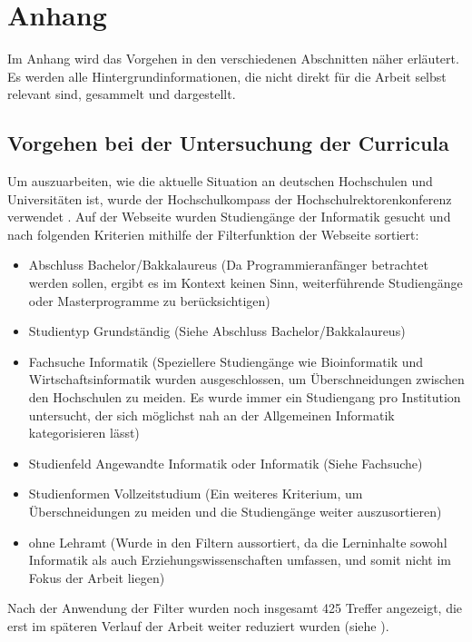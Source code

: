 \clearpage
\section{Anhang}
\label{sec:appendix}

Im Anhang wird das Vorgehen in den verschiedenen Abschnitten näher erläutert. Es werden alle Hintergrundinformationen, die nicht direkt für die Arbeit selbst relevant sind, gesammelt und dargestellt.

\subsection{Vorgehen bei der Untersuchung der Curricula}\label{sec:analysis_curric}
Um auszuarbeiten, wie die aktuelle Situation an deutschen Hochschulen und Universitäten ist, wurde der Hochschulkompass der Hochschulrektorenkonferenz verwendet \cite{hochschulkompass}.
Auf der Webseite wurden Studiengänge der Informatik gesucht und nach folgenden Kriterien mithilfe der Filterfunktion der Webseite sortiert:

\begin{itemize}
    \item Abschluss Bachelor/Bakkalaureus (Da Programmieranfänger betrachtet werden sollen, ergibt es im Kontext keinen Sinn, weiterführende Studiengänge oder Masterprogramme zu berücksichtigen)
    \item Studientyp Grundständig (Siehe Abschluss Bachelor/Bakkalaureus)
    \item Fachsuche Informatik (Speziellere Studiengänge wie Bioinformatik und Wirtschaftsinformatik wurden ausgeschlossen, um Überschneidungen zwischen den Hochschulen zu meiden. Es wurde immer ein Studiengang pro Institution untersucht, der sich möglichst nah an der Allgemeinen Informatik kategorisieren lässt)
    \item Studienfeld Angewandte Informatik oder Informatik (Siehe Fachsuche)
    \item Studienformen Vollzeitstudium (Ein weiteres Kriterium, um Überschneidungen zu meiden und die Studiengänge weiter auszusortieren)
    \item ohne Lehramt (Wurde in den Filtern aussortiert, da die Lerninhalte sowohl Informatik als auch Erziehungswissenschaften umfassen, und somit nicht im Fokus der Arbeit liegen)
\end{itemize}

Nach der Anwendung der Filter wurden noch insgesamt 425 Treffer angezeigt, die erst im späteren Verlauf der Arbeit weiter reduziert wurden (siehe ).

